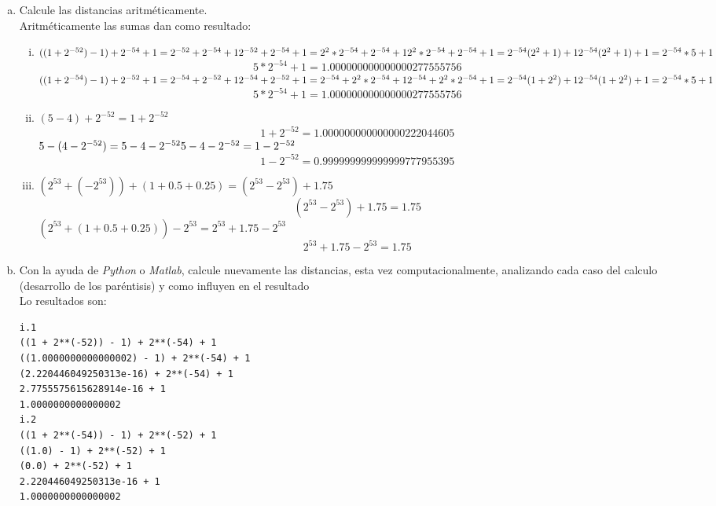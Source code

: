 \documentclass[10pt|letterpaper]{article}
\begin{document}
\begin{enumerate}[a)]
\item Calcule las distancias aritméticamente.\\
Aritméticamente las sumas dan como resultado:
\begin{enumerate}[i.]
\item $((1 + 2^{-52}) - 1) + 2^{-54} + 1 = 2^{-52} + 2^{-54} + 1\\
2^{-52} + 2^{-54} + 1 = 2^{2} * 2^{-54} + 2^{-54} + 1\\
2^{2} * 2^{-54} + 2^{-54} + 1 = 2^{-54}( 2^{2} + 1) + 1\\
2^{-54}( 2^{2} + 1) + 1 = 2^{-54} * 5 + 1$
$$5 * 2^{-54} + 1 = 1.000000000000000277555756$$
\newline 
\newline
$((1 + 2^{-54}) - 1) + 2^{-52} + 1 = 2^{-54} + 2^{-52} + 1\\
2^{-54} + 2^{-52} + 1 = 2^{-54} + 2^{2} * 2^{-54} + 1 \\
2^{-54} + 2^{2} * 2^{-54} + 1 = 2^{-54}( 1 + 2^{2}) + 1\\
2^{-54}( 1 + 2^{2}) + 1 = 2^{-54} * 5 + 1$
$$5 * 2^{-54} + 1 = 1.000000000000000277555756$$
\item $(5 - 4) + 2^{-52} = 1 + 2^{-52}$ 
$$1 + 2^{-52} = 1.000000000000000222044605$$
\newline 
\newline
$5 - (4 - 2^{-52}) = 5 - 4 - 2^{-52}\\
5 - 4 - 2^{-52} = 1 - 2^{-52}$
$$1 - 2^{-52} = 0.999999999999999777955395$$
\item $(2^{53} + (-2^{53})) + (1 + 0.5 + 0.25) = (2^{53} - 2^{53}) + 1.75$
$$(2^{53} - 2^{53}) + 1.75 = 1.75$$
\newline 
\newline
$(2^{53} + (1 + 0.5 + 0.25)) - 2^{53} = 2^{53} + 1.75 -  2^{53}$ 
$$2^{53} + 1.75 -  2^{53} = 1.75$$
\end{enumerate}

\item Con la ayuda de \textit{Python} o \textit{Matlab}, calcule nuevamente las distancias, esta vez computacionalmente, analizando cada caso del calculo (desarrollo de los paréntisis) y como influyen en el resultado\\
Lo resultados son:
\begin{verbatim}
i.1
((1 + 2**(-52)) - 1) + 2**(-54) + 1
((1.0000000000000002) - 1) + 2**(-54) + 1
(2.220446049250313e-16) + 2**(-54) + 1
2.7755575615628914e-16 + 1
1.0000000000000002
i.2
((1 + 2**(-54)) - 1) + 2**(-52) + 1
((1.0) - 1) + 2**(-52) + 1
(0.0) + 2**(-52) + 1
2.220446049250313e-16 + 1
1.0000000000000002


\end{verbatim}
\end{enumerate}
\end{document}
